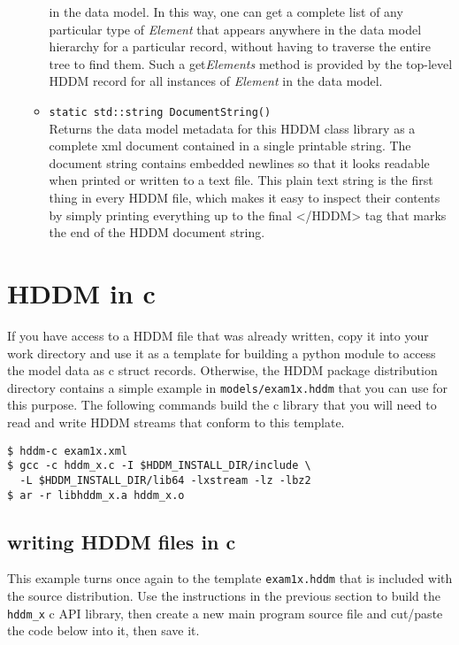 \documentclass{revtex4}
\begin{document}
\begin{itemize}
\begin{itemize}
in the data model. In this way, one can get a complete
list of any particular type of {\em Element} that appears anywhere in
the data model hierarchy for a particular record, without having to traverse 
the entire tree to find them. Such a get{\em Elements} method is
provided by the top-level HDDM record for all instances of {\em Element} 
in the data model.
\item \texttt{static std::string DocumentString()}\\
Returns the data model metadata for this HDDM class library as a complete xml
document contained in a single printable string. The document string contains
embedded newlines so that it looks readable when printed or written to a text
file. This plain text string is the first thing in every HDDM file, which
makes it easy to inspect their contents by simply printing everything up to
the final </HDDM> tag that marks the end of the HDDM document string.
\end{itemize}
\end{itemize}

\section{HDDM in c}

If you have access to a HDDM file that was already written, copy it into your
work directory and use it as a template for building a python module to access
the model data as c struct records. Otherwise, the HDDM package distribution directory
contains a simple example in \texttt{models/exam1x.hddm} that you can use for
this purpose. The following commands build the c library that you will need
to read and write HDDM streams that conform to this template.

\vspace{0.5cm}
\begin{minipage}{12cm}
\begin{verbatim}
$ hddm-c exam1x.xml
$ gcc -c hddm_x.c -I $HDDM_INSTALL_DIR/include \
  -L $HDDM_INSTALL_DIR/lib64 -lxstream -lz -lbz2
$ ar -r libhddm_x.a hddm_x.o
\end{verbatim}
\end{minipage}
\vspace{0.5cm}

\subsection{writing HDDM files in c}

This example turns once again to the template \texttt{exam1x.hddm} that is included
with the source distribution. Use the instructions in the previous section to build
the \texttt{hddm\_x} c API library, then create a new main program source file and
cut/paste the code below into it, then save it.
\end{document}
